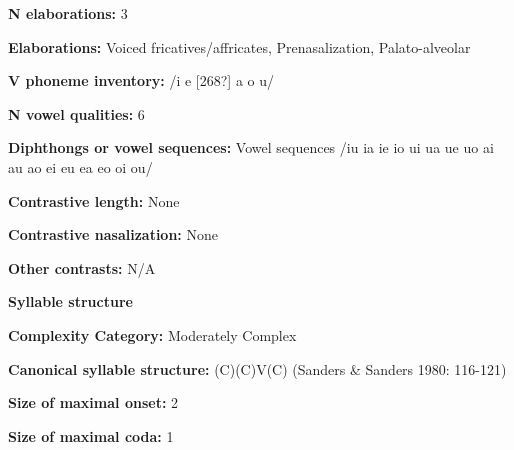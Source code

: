 \begin{styleBody}
\textbf{N elaborations:} 3
\end{styleBody}

\begin{styleBody}
\textbf{Elaborations:} Voiced fricatives/affricates, Prenasalization, Palato-alveolar
\end{styleBody}

\begin{styleBody}
\textbf{V phoneme inventory:} /i e [268?] a o u/
\end{styleBody}

\begin{styleBody}
\textbf{N vowel qualities:} 6
\end{styleBody}

\begin{styleBody}
\textbf{Diphthongs or vowel sequences:} Vowel sequences /iu ia ie io ui ua ue uo ai au ao ei eu ea eo oi ou/
\end{styleBody}

\begin{styleBody}
\textbf{Contrastive length:} None
\end{styleBody}

\begin{styleBody}
\textbf{Contrastive nasalization:} None
\end{styleBody}

\begin{styleBody}
\textbf{Other contrasts:} N/A
\end{styleBody}

\begin{styleBody}
\textbf{Syllable structure}
\end{styleBody}

\begin{styleBody}
\textbf{Complexity Category:} Moderately Complex
\end{styleBody}

\begin{styleBody}
\textbf{Canonical syllable structure:} (C)(C)V(C) (Sanders \& Sanders 1980: 116-121)
\end{styleBody}

\begin{styleBody}
\textbf{Size of maximal onset:} 2
\end{styleBody}

\begin{styleBody}
\textbf{Size of maximal coda:} 1
\end{styleBody}

